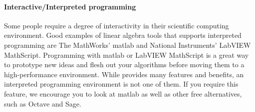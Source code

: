 \paragraph{Interactive/Interpreted programming}
Some people require a degree of interactivity in their scientific computing
environment.
Good examples of linear algebra tools that supports interpreted programming
are The MathWorks' {\sc matlab} and National Instruments' LabVIEW MathScript.
Programming with {\sc matlab} or LabVIEW MathScript is a great way to prototype
new ideas and flesh out your algorithms before moving them to a high-performance
environment.
While \libflame provides many features and benefits, an interpreted programming
environment is not one of them.
If you require this feature, we encourage you to look at {\sc matlab} as well
as other free alternatives, such as Octave and Sage.


